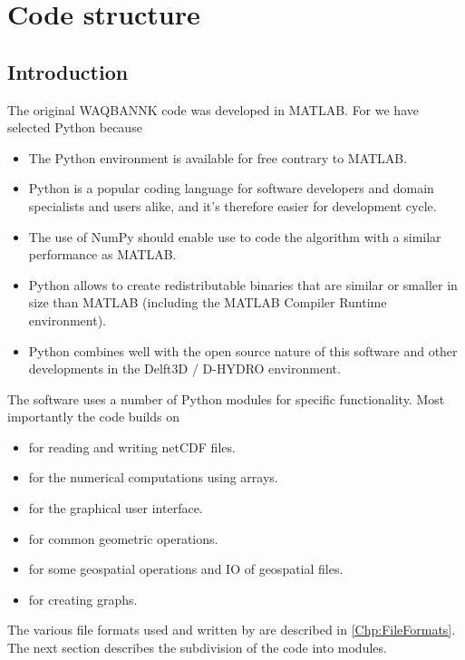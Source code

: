 \chapter{Code structure}

\section{Introduction}

The original WAQBANNK code was developed in MATLAB.
For \dfastbe we have selected Python because

\begin{itemize}
\item The Python environment is available for free contrary to MATLAB.
\item Python is a popular coding language for software developers and domain specialists and users alike, and it's therefore easier for development cycle.
\item The use of NumPy should enable use to code the algorithm with a similar performance as MATLAB.
\item Python allows to create redistributable binaries that are similar or smaller in size than MATLAB (including the MATLAB Compiler Runtime environment).
\item Python combines well with the open source nature of this software and other developments in the Delft3D / D-HYDRO environment.
\end{itemize}

The software uses a number of Python modules for specific functionality.
Most importantly the code builds on

\begin{itemize}
\item {} for reading and writing netCDF files.
\item {} for the numerical computations using arrays.
\item {} for the graphical user interface.
\item {} for common geometric operations.
\item {} for some geospatial operations and IO of geospatial files.
\item {} for creating graphs.
\end{itemize}

The various file formats used and written by \dfastbe are described in \autoref{Chp:FileFormats}.
The next section describes the subdivision of the code into modules.

